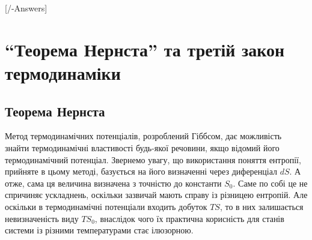 

\setcounter{chapter}{5}

[\currfilebase/\currfilebase-Answers]
\chapter{\enquote{Теорема Нернста} та третій закон термодинаміки}\label{\currfilebase}
\graphicspath{{\currfilebase/pictures}}
\makeatletter
{}
\makeatother

\section{Теорема Нернста}



Метод термодинамічних потенціалів, розроблений Гіббсом, дає можливість знайти термодинамічні властивості будь-якої речовини, якщо відомий його термодинамічний потенціал. Звернемо увагу, що використання поняття ентропії, прийняте в цьому методі, базується на його визначенні через диференціал $dS$. А отже, сама ця величина визначена з точністю до константи $S_0$.  Саме по собі це не спричиняє ускладнень, оскільки зазвичай мають справу із різницею ентропій. Але оскільки в термодинамічні потенціали входить добуток $TS$, то в них залишається невизначеність виду $TS_0$, внаслідок чого їх практична корисність для станів системи із різними температурами стає ілюзорною.

